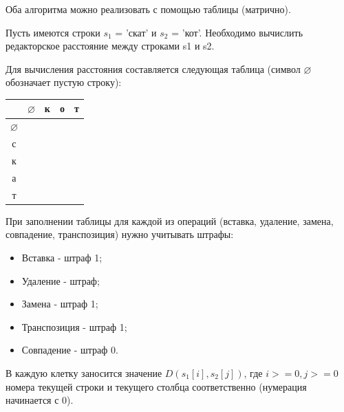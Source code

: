 \documentclass[14pt]{report}
\begin{document}



Оба алгоритма можно реализовать с помощью таблицы (матрично).

Пусть имеются строки $s_{1}$ = 'скат' и $s_{2}$ = 'кот'. Необходимо вычислить редакторское расстояние между строками s1 и s2.

Для вычисления расстояния составляется следующая таблица (символ $\varnothing$ обозначает пустую строку):

\begin{tabular}{ | c || c | c | c | c | }
\hline
    & $\varnothing$ & к & о & т \\ \hline \hline
	$\varnothing$ &  &  &  &  \\ \hline
	с &  &  &  &  \\ \hline
  к &  &  &  &  \\ \hline
  а &  &  &  &  \\ \hline
  т &  &  &  &  \\ \hline
\end{tabular}

При заполнении таблицы для каждой из операций (вставка, удаление, замена, совпадение, транспозиция) нужно учитывать штрафы:
\begin{itemize}
	\item Вставка - штраф 1;
	\item Удаление - штраф;
	\item Замена - штраф 1;
	\item Транспозиция - штраф 1;
	\item Совпадение - штраф 0.
\end{itemize}

В каждую клетку заносится значение $D(s_{1}[i], s_{2}[j])$, где $i >= 0, j >= 0$ номера текущей строки и текущего столбца соответственно (нумерация начинается с 0).
\end{document}
